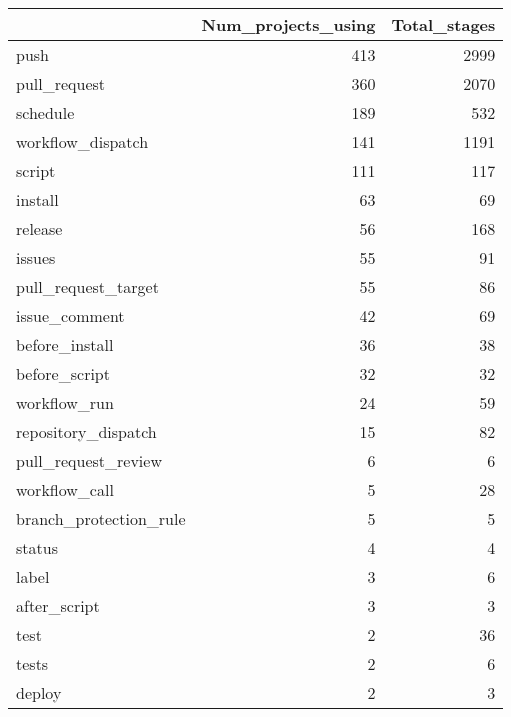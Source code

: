 \begin{tabular}{lrr}
\toprule
{} &  Num\_projects\_using &  Total\_stages \\
\midrule
push                        &                 413 &          2999 \\
pull\_request                &                 360 &          2070 \\
schedule                    &                 189 &           532 \\
workflow\_dispatch           &                 141 &          1191 \\
script                      &                 111 &           117 \\
install                     &                  63 &            69 \\
release                     &                  56 &           168 \\
issues                      &                  55 &            91 \\
pull\_request\_target         &                  55 &            86 \\
issue\_comment               &                  42 &            69 \\
before\_install              &                  36 &            38 \\
before\_script               &                  32 &            32 \\
workflow\_run                &                  24 &            59 \\
repository\_dispatch         &                  15 &            82 \\
pull\_request\_review         &                   6 &             6 \\
workflow\_call               &                   5 &            28 \\
branch\_protection\_rule      &                   5 &             5 \\
status                      &                   4 &             4 \\
label                       &                   3 &             6 \\
after\_script                &                   3 &             3 \\
test                        &                   2 &            36 \\
tests                       &                   2 &             6 \\
deploy                      &                   2 &             3 \\

\end{tabular}
